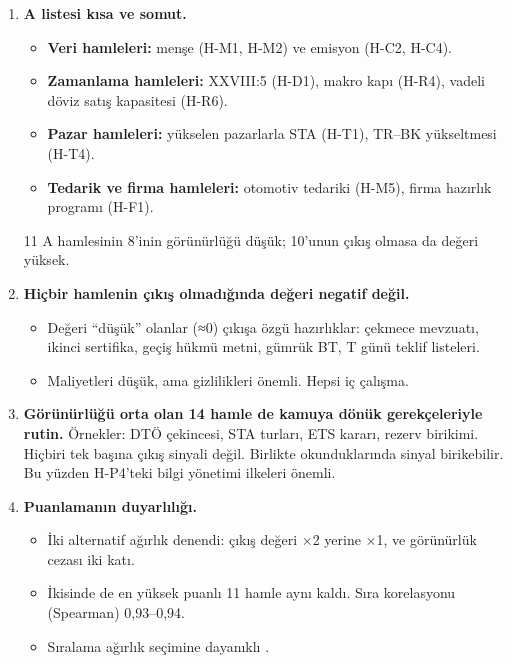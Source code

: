 \begin{enumerate}
\def\labelenumi{\arabic{enumi}.}
\item
  \textbf{A listesi kısa ve somut.}

  \begin{itemize}
  \tightlist
  \item
    \textbf{Veri hamleleri:} menşe (H-M1, H-M2) ve emisyon (H-C2, H-C4).
  \item
    \textbf{Zamanlama hamleleri:} XXVIII:5 (H-D1), makro kapı (H-R4), vadeli döviz satış kapasitesi (H-R6).
  \item
    \textbf{Pazar hamleleri:} yükselen pazarlarla STA (H-T1), TR--BK yükseltmesi (H-T4).
  \item
    \textbf{Tedarik ve firma hamleleri:} otomotiv tedariki (H-M5), firma hazırlık programı (H-F1).
  \end{itemize}

  11 A hamlesinin 8'inin görünürlüğü düşük; 10'unun çıkış olmasa da değeri yüksek.
\item
  \textbf{Hiçbir hamlenin çıkış olmadığında değeri negatif değil.}

  \begin{itemize}
  \tightlist
  \item
    Değeri ``düşük'' olanlar (≈0) çıkışa özgü hazırlıklar: çekmece mevzuatı, ikinci sertifika, geçiş hükmü metni, gümrük BT, T günü teklif listeleri.
  \item
    Maliyetleri düşük, ama gizlilikleri önemli. Hepsi iç çalışma.
  \end{itemize}
\item
  \textbf{Görünürlüğü orta olan 14 hamle de kamuya dönük gerekçeleriyle rutin.} Örnekler: DTÖ çekincesi, STA turları, ETS kararı, rezerv birikimi. Hiçbiri tek başına çıkış sinyali değil. Birlikte okunduklarında sinyal birikebilir. Bu yüzden H-P4'teki bilgi yönetimi ilkeleri önemli.
\item
  \textbf{Puanlamanın duyarlılığı.}

  \begin{itemize}
  \tightlist
  \item
    İki alternatif ağırlık denendi: çıkış değeri ×2 yerine ×1, ve görünürlük cezası iki katı.
  \item
    İkisinde de en yüksek puanlı 11 hamle aynı kaldı. Sıra korelasyonu (Spearman) 0,93--0,94.
  \item
    Sıralama ağırlık seçimine dayanıklı \etiketT{}.
  \end{itemize}
\end{enumerate}

